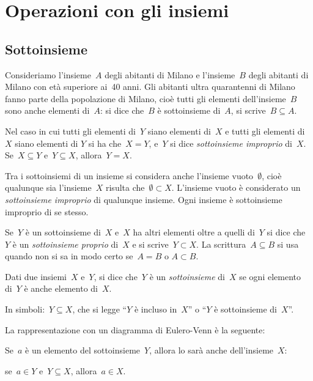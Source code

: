 

\section{Operazioni con gli insiemi}
\label{sec:insiemi_operazioni}

\subsection{Sottoinsieme}
\label{subsec:op_sottoinsieme}

Consideriamo l'insieme~$A$ degli abitanti di Milano e l'insieme~$B$ degli 
abitanti di Milano con età superiore ai~40 anni. Gli abitanti ultra 
quarantenni di Milano fanno parte della popolazione di Milano, cioè tutti gli
elementi dell'insieme~$B$ sono anche elementi di~$A$: si dice che~$B$ è 
sottoinsieme di~$A$, si scrive~$B\subseteq A$.

Nel caso in cui tutti gli elementi di~$Y$ siano elementi di~$X$ e tutti gli 
elementi di~$X$ siano elementi di
$Y$ si ha che~$X=Y$, e~$Y$ si dice \emph{sottoinsieme improprio} di~$X$.
Se~$X\subseteq Y$ e~$Y\subseteq X$, allora~$Y=X$.

Tra i sottoinsiemi di un insieme si considera anche
l'insieme vuoto~$\emptyset $, cioè qualunque sia l'insieme~$X$ risulta 
che~$\emptyset \subset X$.
L'insieme vuoto è considerato un \emph{sottoinsieme improprio} di qualunque 
insieme.
Ogni insieme è sottoinsieme improprio di se stesso.

Se~$Y$ è un sottoinsieme di~$X$ e~$X$ ha altri elementi oltre a quelli di~$Y$
si dice che~$Y$ è un \emph{sottoinsieme proprio} di~$X$ e si scrive~$Y\subset X$.
La scrittura~$A\subseteq B$ si usa quando non si sa in modo certo se~$A=B$ o
$A\subset B$.

\begin{definizione}
Dati due insiemi~$X$ e~$Y$, si dice che~$Y$ è un \emph{sottoinsieme} di~$X$
se ogni elemento di~$Y$ è anche elemento di~$X$.

In simboli:~$Y\subseteq X$, che si legge
``$Y$ è incluso in~$X$'' o ``$Y$ è sottoinsieme di~$X$''.
\end{definizione}

La rappresentazione con un diagramma di Eulero-Venn è la seguente:
\begin{center}

\end{center}
Se~$a$ è un elemento del sottoinsieme~$Y$, allora lo sarà anche 
dell'insieme~$X$:
\begin{center}
se~$a\in Y$ e~$Y\subseteq X$, allora~$a\in X$.
\end{center}

